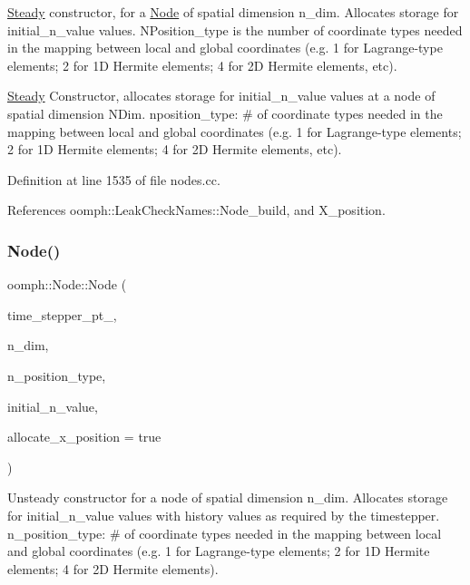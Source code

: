 \hyperlink{classoomph_1_1Steady}{Steady} constructor, for a \hyperlink{classoomph_1_1Node}{Node} of spatial dimension n\+\_\+dim. Allocates storage for initial\+\_\+n\+\_\+value values. N\+Position\+\_\+type is the number of coordinate types needed in the mapping between local and global coordinates (e.\+g. 1 for Lagrange-\/type elements; 2 for 1D Hermite elements; 4 for 2D Hermite elements, etc). 

\hyperlink{classoomph_1_1Steady}{Steady} Constructor, allocates storage for initial\+\_\+n\+\_\+value values at a node of spatial dimension N\+Dim. nposition\+\_\+type\+: \# of coordinate types needed in the mapping between local and global coordinates (e.\+g. 1 for Lagrange-\/type elements; 2 for 1D Hermite elements; 4 for 2D Hermite elements, etc). 

Definition at line 1535 of file nodes.\+cc.



References oomph\+::\+Leak\+Check\+Names\+::\+Node\+\_\+build, and X\+\_\+position.

\mbox{\label{classoomph_1_1Node_a8a7c3c5e13ba0f434028ed2f93268a6e}} 
\subsubsection{\texorpdfstring{Node()}{Node()}\hspace{0.1cm}{\footnotesize\ttfamily [3/4]}}
{\footnotesize\ttfamily oomph\+::\+Node\+::\+Node (\begin{DoxyParamCaption}\item[{\hyperlink{classoomph_1_1TimeStepper}{Time\+Stepper} $\ast$const \&}]{time\+\_\+stepper\+\_\+pt\+\_\+,  }\item[{const unsigned \&}]{n\+\_\+dim,  }\item[{const unsigned \&}]{n\+\_\+position\+\_\+type,  }\item[{const unsigned \&}]{initial\+\_\+n\+\_\+value,  }\item[{const bool \&}]{allocate\+\_\+x\+\_\+position = {\ttfamily true} }\end{DoxyParamCaption})}



Unsteady constructor for a node of spatial dimension n\+\_\+dim. Allocates storage for initial\+\_\+n\+\_\+value values with history values as required by the timestepper. n\+\_\+position\+\_\+type\+: \# of coordinate types needed in the mapping between local and global coordinates (e.\+g. 1 for Lagrange-\/type elements; 2 for 1D Hermite elements; 4 for 2D Hermite elements). 

